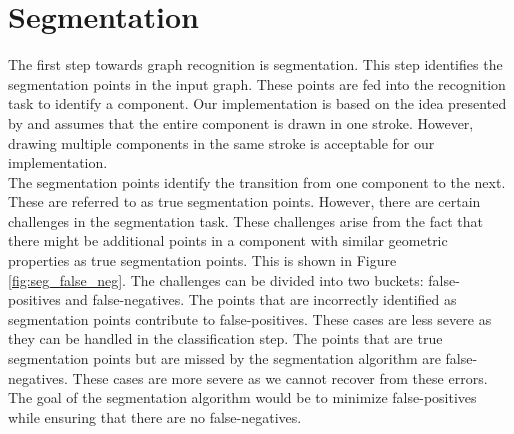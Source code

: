 \section{Segmentation}
\label{sec:segmentation}
The first step towards graph recognition is segmentation. This step identifies the segmentation points in the input graph. These points are fed into the recognition task to identify a component. Our implementation is based on the idea presented by \citeauthor{daly2015hand} \cite{daly2015hand} and assumes that the entire component is drawn in one stroke. However, drawing multiple components in the same stroke is acceptable for our implementation.\\

The segmentation points identify the transition from one component to the next. These are referred to as true segmentation points.  However, there are certain challenges in the segmentation task. These challenges arise from the fact that there might be additional points in a component with similar geometric properties as true segmentation points. This is shown in Figure \ref{fig:seg_false_neg}. The challenges can be divided into two buckets: false-positives and false-negatives. The points that are incorrectly identified as segmentation points contribute to false-positives. These cases are less severe as they can be handled in the classification step. The points that are true segmentation points but are missed by the segmentation algorithm are false-negatives. These cases are more severe as we cannot recover from these errors. The goal of the segmentation algorithm would be to minimize false-positives while ensuring that there are no false-negatives.\\

